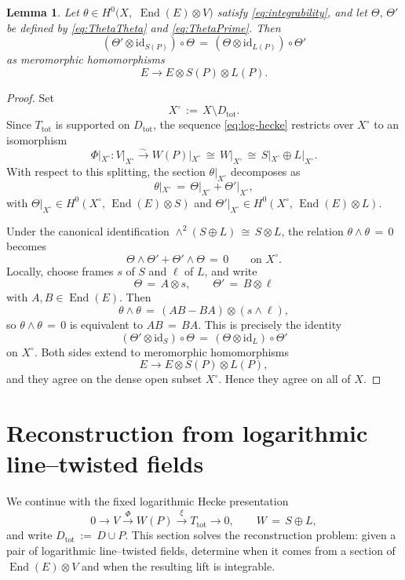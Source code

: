 \documentclass[a4paper,12pt]{amsart}
\numberwithin{equation}{section}
\newtheorem{lemma}[theorem]{Lemma}
\theoremstyle{definition}
\newcommand{\End}{\operatorname{End}}
\newcommand{\id}{\mathrm{id}}
\begin{document}
\begin{lemma}\label{lem:comm}
Let \(\theta\in H^0\bigl(X,\,\, \End(E)\otimes V\bigr)\) satisfy \eqref{eq:integrability}, and let \(\Theta,\,\Theta'\) be defined by \eqref{eq:ThetaTheta} and \eqref{eq:ThetaPrime}.  Then
\begin{equation}\label{eq:comm}
(\Theta'\otimes \id_{S(P)})\circ \Theta
\,=\,
(\Theta\otimes \id_{L(P)})\circ \Theta'
\end{equation}
as meromorphic homomorphisms
\[
E\longrightarrow E\otimes S(P)\otimes L(P).
\]
\end{lemma}
\begin{proof}
Set
\[
X^\circ\,:=\,X\setminus D_{\mathrm{tot}}.
\]
Since \(T_{\mathrm{tot}}\) is supported on \(D_{\mathrm{tot}}\), the sequence \eqref{eq:log-hecke} restricts over \(X^\circ\) to an isomorphism
\[
\Phi|_{X^\circ}:V|_{X^\circ}\xrightarrow{\sim} W(P)|_{X^\circ}\,\cong\, W|_{X^\circ}
\,\cong\, S|_{X^\circ}\oplus L|_{X^\circ}.
\]
With respect to this splitting, the section \(\theta|_{X^\circ}\) decomposes as
\[
\theta|_{X^\circ}\,=\,\Theta|_{X^\circ}+\Theta'|_{X^\circ},
\]
with \(\Theta|_{X^\circ}\in H^0(X^\circ,\, \End(E)\otimes S)\) and
\(\Theta'|_{X^\circ}\in H^0(X^\circ,\, \End(E)\otimes L)\).

Under the canonical identification \(\wedge^2(S\oplus L)\,\cong\, S\otimes L\), the relation \(\theta\wedge\theta\,=\,0\) becomes
\[
\Theta\wedge\Theta'+\Theta'\wedge\Theta\,=\,0
\qquad\text{on }X^\circ.
\]
Locally, choose frames \(s\) of \(S\) and \(\ell\) of \(L\), and write
\[
\Theta\,=\,A\otimes s,\qquad \Theta'\,=\,B\otimes \ell
\]
with \(A,B\in \End(E)\).  Then
\[
\theta\wedge\theta\,=\,(AB-BA)\otimes (s\wedge \ell),
\]
so \(\theta\wedge\theta\,=\,0\) is equivalent to \(AB\,=\,BA\).  This is precisely the identity
\[
(\Theta'\otimes \id_S)\circ \Theta
\,=\,
(\Theta\otimes \id_L)\circ \Theta'
\]
on \(X^\circ\). Both sides extend to meromorphic homomorphisms
\[
E\longrightarrow E\otimes S(P)\otimes L(P),
\]
and they agree on the dense open subset \(X^\circ\).  Hence they agree on all of \(X\).
\end{proof}
\section{Reconstruction from logarithmic line--twisted fields}\label{sec:reconstruction}
We continue with the fixed logarithmic Hecke presentation
\[
0\longrightarrow V \xrightarrow{\ \Phi\ } W(P)\xrightarrow{\ \xi\ } T_{\mathrm{tot}}\longrightarrow 0,
\qquad W\,=\,S\oplus L,
\]
and write \(D_{\mathrm{tot}}\,:=\,D\cup P\).  This section solves the reconstruction problem: given a pair of logarithmic line--twisted fields, determine when it comes from a section of \(\End(E)\otimes V\) and when the resulting lift is integrable.
\end{document}
